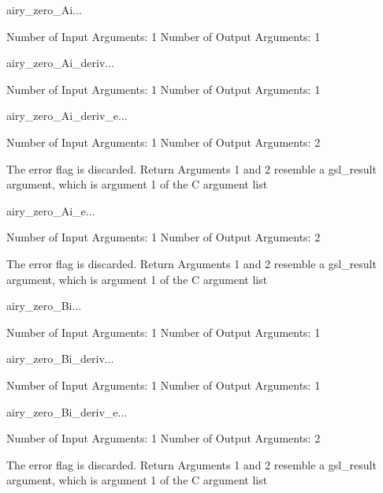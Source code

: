 \begin{funcdesc}{airy_zero_Ai}{...}

    Number of Input  Arguments:  1
    Number of Output Arguments:  1
\end{funcdesc}

\begin{funcdesc}{airy_zero_Ai_deriv}{...}

    Number of Input  Arguments:  1
    Number of Output Arguments:  1
\end{funcdesc}

\begin{funcdesc}{airy_zero_Ai_deriv_e}{...}

    Number of Input  Arguments:  1
    Number of Output Arguments:  2

The error flag is discarded.
Return Arguments 1 and 2 resemble a gsl_result argument,
	which is  argument 1 of the C argument list

\end{funcdesc}

\begin{funcdesc}{airy_zero_Ai_e}{...}

    Number of Input  Arguments:  1
    Number of Output Arguments:  2

The error flag is discarded.
Return Arguments 1 and 2 resemble a gsl_result argument,
	which is  argument 1 of the C argument list

\end{funcdesc}

\begin{funcdesc}{airy_zero_Bi}{...}

    Number of Input  Arguments:  1
    Number of Output Arguments:  1
\end{funcdesc}

\begin{funcdesc}{airy_zero_Bi_deriv}{...}

    Number of Input  Arguments:  1
    Number of Output Arguments:  1
\end{funcdesc}

\begin{funcdesc}{airy_zero_Bi_deriv_e}{...}

    Number of Input  Arguments:  1
    Number of Output Arguments:  2

The error flag is discarded.
Return Arguments 1 and 2 resemble a gsl_result argument,
	which is  argument 1 of the C argument list

\end{funcdesc}

